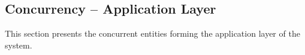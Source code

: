 \subsection{Concurrency -- Application Layer}
This section presents the concurrent entities forming the application layer of the system.




